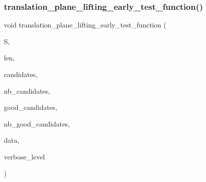 \subsubsection{\texorpdfstring{translation\+\_\+plane\+\_\+lifting\+\_\+early\+\_\+test\+\_\+function()}{translation\_plane\_lifting\_early\_test\_function()}}
{\footnotesize\ttfamily void translation\+\_\+plane\+\_\+lifting\+\_\+early\+\_\+test\+\_\+function (\begin{DoxyParamCaption}\item[{\mbox{\hyperlink{galois_8h_a09fddde158a3a20bd2dcadb609de11dc}{I\+NT}} $\ast$}]{S,  }\item[{\mbox{\hyperlink{galois_8h_a09fddde158a3a20bd2dcadb609de11dc}{I\+NT}}}]{len,  }\item[{\mbox{\hyperlink{galois_8h_a09fddde158a3a20bd2dcadb609de11dc}{I\+NT}} $\ast$}]{candidates,  }\item[{\mbox{\hyperlink{galois_8h_a09fddde158a3a20bd2dcadb609de11dc}{I\+NT}}}]{nb\+\_\+candidates,  }\item[{\mbox{\hyperlink{galois_8h_a09fddde158a3a20bd2dcadb609de11dc}{I\+NT}} $\ast$}]{good\+\_\+candidates,  }\item[{\mbox{\hyperlink{galois_8h_a09fddde158a3a20bd2dcadb609de11dc}{I\+NT}} \&}]{nb\+\_\+good\+\_\+candidates,  }\item[{void $\ast$}]{data,  }\item[{\mbox{\hyperlink{galois_8h_a09fddde158a3a20bd2dcadb609de11dc}{I\+NT}}}]{verbose\+\_\+level }\end{DoxyParamCaption})}

\mbox{\label{translation__plane_8_c_a9f6016446941b13afad657c3459ca1c6}} 
